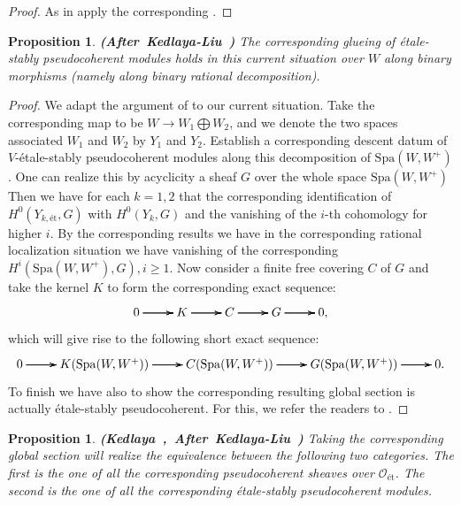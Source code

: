 \documentclass[12pt]{amsart}
\newtheorem{proposition}[theorem]{Proposition}
\theoremstyle{definition}
\numberwithin{equation}{section}
\begin{document}
\begin{proof}
As in \cite[Theorem 2.5.11]{KL2} apply the corresponding \cite[Proposition 8.2.21]{KL1}.	
\end{proof}



\begin{proposition}\mbox{\bf{(After Kedlaya-Liu \cite[Lemma 2.5.13]{KL2})}}
The corresponding glueing of \'etale-stably pseudocoherent modules holds in this current situation over $W$ along binary morphisms (namely along binary rational decomposition). 	
\end{proposition}

\begin{proof}
We adapt the argument of \cite[Lemma 2.5.13]{KL2} to our current situation. Take the corresponding map to be $W\rightarrow W_1\bigoplus W_2$, and we denote the two spaces associated $W_1$ and $W_2$ by $Y_1$ and $Y_2$. Establish a corresponding descent datum of $V$-\'etale-stably pseudocoherent modules along this decomposition of $\mathrm{Spa}(W,W^+)$. One can realize this by acyclicity a sheaf $G$ over the whole space $\mathrm{Spa}(W,W^+)$ Then we have for each $k=1,2$ that the corresponding identification of $H^0(Y_{k,\text{\'et}},G)$ with $H^0(Y_k,G)$ and the vanishing of the $i$-th cohomology for higher $i$. By the corresponding results we have in the corresponding rational localization situation we have vanishing of the corresponding $H^i(\mathrm{Spa}(W,W^+),G),i\geq 1$. Now consider a finite free covering $C$ of $G$ and take the kernel $K$ to form the corresponding exact sequence:
\[
\xymatrix@C+0pc@R+0pc{
0 \ar[r] \ar[r] \ar[r] &K \ar[r] \ar[r] \ar[r] &C  \ar[r] \ar[r] \ar[r] &G \ar[r] \ar[r] \ar[r] &0 ,   
}
\]
which will give rise to the following short exact sequence:
\[
\xymatrix@C+0pc@R+0pc{
0 \ar[r] \ar[r] \ar[r] &K(\mathrm{Spa}(W,W^+)) \ar[r] \ar[r] \ar[r] &C(\mathrm{Spa}(W,W^+))  \ar[r] \ar[r] \ar[r] &G(\mathrm{Spa}(W,W^+)) \ar[r] \ar[r] \ar[r] &0.   
}
\]
To finish we have also to show the corresponding resulting global section is actually \'etale-stably pseudocoherent. For this, we refer the readers to \cite[Lemma 2.22]{TX2}.

  	
\end{proof}


\begin{proposition} \mbox{\bf{(Kedlaya \cite[Below Lemma 1.10.4]{Ked1}, After Kedlaya-Liu \cite[Theorem 2.5.14]{KL2})}}
Taking the corresponding global section will realize the equivalence between the following two categories. The first is the one of all the corresponding pseudocoherent sheaves over $\mathcal{O}_{\text{\'et}}$. The second is the one of all the corresponding \'etale-stably pseudocoherent modules.	
\end{proposition}
\end{document}
